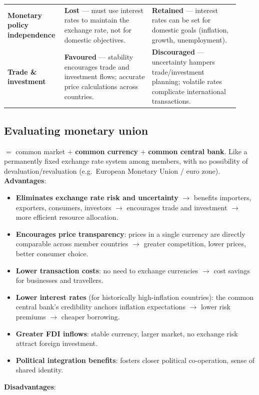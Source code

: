 \begin{center}
\begin{tabular}{p{0.2\linewidth}|p{0.36\linewidth}|p{0.36\linewidth}}
\textbf{Monetary policy independence} & \textbf{Lost} --- must use interest rates to maintain the exchange rate, not for domestic objectives. & \textbf{Retained} --- interest rates can be set for domestic goals (inflation, growth, unemployment). \\
\textbf{Trade \& investment} & \textbf{Favoured} --- stability encourages trade and investment flows; accurate price calculations across countries. & \textbf{Discouraged} --- uncertainty hampers trade/investment planning; volatile rates complicate international transactions. \\
\bottomrule
\end{tabular}
\end{center}
\subsection{Evaluating monetary union}
 $=$ common market $+$ \textbf{common currency} $+$ \textbf{common central bank}. Like a permanently fixed exchange rate system among members, with no possibility of devaluation/revaluation (e.g.\ European Monetary Union / euro zone).
\\
\textbf{Advantages}:
\begin{itemize}
  \item \textbf{Eliminates exchange rate risk and uncertainty} $\to$ benefits importers, exporters, consumers, investors $\to$ encourages trade and investment $\to$ more efficient resource allocation.
  \item \textbf{Encourages price transparency}: prices in a single currency are directly comparable across member countries $\to$ greater competition, lower prices, better consumer choice.
  \item \textbf{Lower transaction costs}: no need to exchange currencies $\to$ cost savings for businesses and travellers.
  \item \textbf{Lower interest rates} (for historically high-inflation countries): the common central bank's credibility anchors inflation expectations $\to$ lower risk premiums $\to$ cheaper borrowing.
  \item \textbf{Greater FDI inflows}: stable currency, larger market, no exchange risk attract foreign investment.
  \item \textbf{Political integration benefits}: fosters closer political co-operation, sense of shared identity.
\end{itemize}
\textbf{Disadvantages}:
